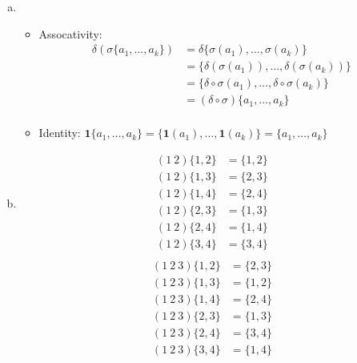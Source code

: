 \documentclass{article}
\newcommand{\set}[1]{ \{ #1 \} }
\newcommand{\id}{ \bm{1} }
\newcommand{\comp}{ \circ }
\begin{document}
\subsubsection{}\label{ex7p8}
\begin{enumerate}[(a)]
\item 
\begin{itemize}
\item Assocativity:
\begin{align*}
\delta(\sigma\set{a_1,\ldots,a_k}) &= \delta\set{\sigma(a_1),\ldots,\sigma(a_k)}\\
&= \set{\delta(\sigma(a_1)),\ldots,\delta(\sigma(a_k))}\\
&= \set{\delta\comp\sigma(a_1),\ldots,\delta\comp\sigma(a_k)}\\
&= (\delta\comp\sigma)\set{a_1,\ldots,a_k}\\
\end{align*}
\item Identity: $\id\set{a_1,\ldots,a_k} = \set{\id(a_1),\ldots,\id(a_k)} = \set{a_1,\ldots,a_k}$
\end{itemize}
\item
\begin{align*}
(1\ 2)\set{1,2} &= \set{1,2}\\
(1\ 2)\set{1,3} &= \set{2,3}\\
(1\ 2)\set{1,4} &= \set{2,4}\\
(1\ 2)\set{2,3} &= \set{1,3}\\
(1\ 2)\set{2,4} &= \set{1,4}\\
(1\ 2)\set{3,4} &= \set{3,4}\\
\end{align*}
\begin{align*}
(1\ 2\ 3)\set{1,2} &= \set{2,3}\\
(1\ 2\ 3)\set{1,3} &= \set{1,2}\\
(1\ 2\ 3)\set{1,4} &= \set{2,4}\\
(1\ 2\ 3)\set{2,3} &= \set{1,3}\\
(1\ 2\ 3)\set{2,4} &= \set{3,4}\\
(1\ 2\ 3)\set{3,4} &= \set{1,4}\\
\end{align*}
\end{enumerate}
\end{document}
